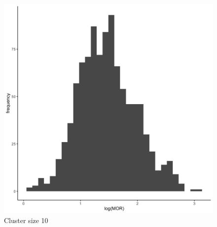 \documentclass[
  letterpaper,
  DIV=11,
  numbers=noendperiod,
  titlepage]{scrartcl}
\begin{document}
\begin{figure}
\begin{minipage}[t]{0.24\linewidth}
{{\includegraphics{../../plots/two-lvl-ran-int/low-prev/hist_30_10_two_lvl_low_prev.png}

}

\caption{Cluster size 10}

}

\end{minipage}%
%
\begin{minipage}[t]{0.24\linewidth}

{\centering 

}
\end{minipage}
\end{figure}
\end{document}
